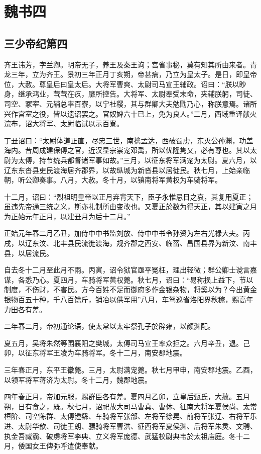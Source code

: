 \documentclass[12pt,UTF8]{ctexbook}
\begin{document}
\part{魏书四}

\chapter{三少帝纪第四}

齐王讳芳，字兰卿。明帝无子，养王及秦王询；宫省事秘，莫有知其所由来者。青龙三年，立为齐王。景初三年正月丁亥朔，帝甚病，乃立为皇太子。是日，即皇帝位，大赦。尊皇后曰皇太后。大将军曹爽、太尉司马宣王辅政。诏曰：“朕以眇身，继承鸿业，茕茕在疚，靡所控告。大将军、太尉奉受末命，夹辅朕躬，司徒、司空、冢宰、元辅总率百寮，以宁社稷，其与群卿大夫勉勖乃心，称朕意焉。诸所兴作宫室之役，皆以遗诏罢之。官奴婢六十已上，免为良人。”二月，西域重译献火浣布，诏大将军、太尉临试以示百寮。

丁丑诏曰：“太尉体道正直，尽忠三世，南擒孟达，西破蜀虏，东灭公孙渊，功盖海内。昔周成建保傅之官，近汉显宗崇宠邓禹，所以优隆隽乂，必有尊也。其以太尉为太傅，持节统兵都督诸军事如故。”三月，以征东将军满宠为太尉。夏六月，以辽东东沓县吏民渡海居齐郡界，以故纵城为新沓县以居徙民。秋七月，上始亲临朝，听公卿奏事。八月，大赦。冬十月，以镇南将军黄权为车骑将军。

十二月，诏曰：“烈祖明皇帝以正月弃背天下，臣子永惟忌日之哀，其复用夏正；虽违先帝通三统之义，斯亦礼制所由变改也。又夏正於数为得天正，其以建寅之月为正始元年正月，以建丑月为后十二月。”

正始元年春二月乙丑，加侍中中书监刘放、侍中中书令孙资为左右光禄大夫。丙戌，以辽东汶、北丰县民流徙渡海，规齐郡之西安、临菑、昌国县界为新汶、南丰县，以居流民。

自去冬十二月至此月不雨。丙寅，诏令狱官亟平冤枉，理出轻微；群公卿士谠言嘉谋，各悉乃心。夏四月，车骑将军黄权薨。秋七月，诏曰：“易称损上益下，节以制度，不伤财，不害民。方今百姓不足而御府多作金银杂物，将奚以为？今出黄金银物百五十种，千八百馀斤，销冶以供军用”八月，车驾巡省洛阳界秋稼，赐高年力田各有差。

二年春二月，帝初通论语，使太常以太牢祭孔子於辟雍，以颜渊配。

夏五月，吴将朱然等围襄阳之樊城，太傅司马宣王率众拒之。六月辛丑，退。己卯，以征东将军王凌为车骑将军。冬十二月，南安郡地震。

三年春正月，东平王徽薨。三月，太尉满宠薨。秋七月甲申，南安郡地震。乙酉，以领军将军蒋济为太尉。冬十二月，魏郡地震。

四年春正月，帝加元服，赐群臣各有差。夏四月乙卯，立皇后甄氏，大赦。五月朔，日有食之，既。秋七月，诏祀故大司马曹真、曹休、征南大将军夏侯尚、太常桓阶、司空陈群、太傅锺繇、车骑将军张郃、左将军徐晃、前将军张辽、右将军乐进、太尉华歆、司徒王朗、骠骑将军曹洪、征西将军夏侯渊、后将军朱灵、文聘、执金吾臧霸、破虏将军李典、立义将军庞德、武猛校尉典韦於太祖庙庭。冬十二月，倭国女王俾弥呼遣使奉献。
\end{document}
